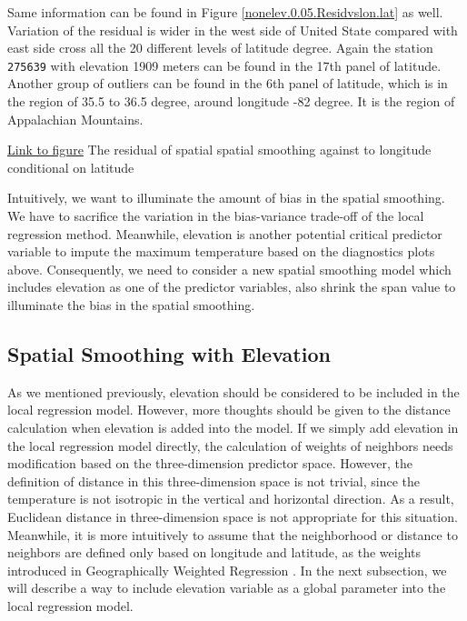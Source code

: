 Same information can be found in Figure 
\href{../plots/a1950/spaimpute/nonelev/span0.05/a1950.spaResid.vs.lon.lat.pdf}
{\ref*{nonelev.0.05.Residvslon.lat}} as well. Variation of the residual is wider
in the west side of United State compared with east side cross all the 20 different
levels of latitude degree. Again the station \texttt{275639} with elevation 1909 
meters can be found in the 17th panel of latitude. Another group of outliers can 
be found in the 6th panel of latitude, which is in the region of 35.5 to 36.5 degree, 
around longitude -82 degree. It is the region of Appalachian Mountains.

\begin{framed}
\begin{center}
  \href{../plots/a1950/spaimpute/nonelev/span0.05/a1950.spaResid.vs.lon.lat.pdf}
  {Link to figure}
  {The residual of spatial spatial smoothing against to longitude conditional on latitude}
  \label{nonelev.0.05.Residvslon.lat}
\end{center}
\end{framed}

Intuitively, we want to illuminate the amount of bias in the spatial smoothing. We have 
to sacrifice the variation in the bias-variance trade-off of the local regression
method. Meanwhile, elevation is another potential critical predictor variable to
impute the maximum temperature based on the diagnostics plots above.
Consequently, we need to consider a new spatial smoothing model which includes elevation as
one of the predictor variables, also shrink the span value to illuminate the 
bias in the spatial smoothing.

\subsection{Spatial Smoothing with Elevation}

As we mentioned previously, elevation should be considered to be included in the 
local regression model. However, more thoughts should be given to the distance 
calculation when elevation is added into the model. If we simply add elevation
in the local regression model directly, the calculation of weights of neighbors
needs modification based on the three-dimension predictor space. However, the 
definition of distance in this three-dimension space is not trivial, since the
temperature is not isotropic in the vertical and horizontal direction. As a 
result, Euclidean distance in three-dimension space is not appropriate for this
situation. Meanwhile, it is more intuitively to assume that the neighborhood or
distance to neighbors are defined only based on longitude and latitude, as the
weights introduced in Geographically Weighted Regression \cite{fotheringhamGWR}.
In the next subsection, we will describe a way to include elevation variable as
a global parameter into the local regression model.

